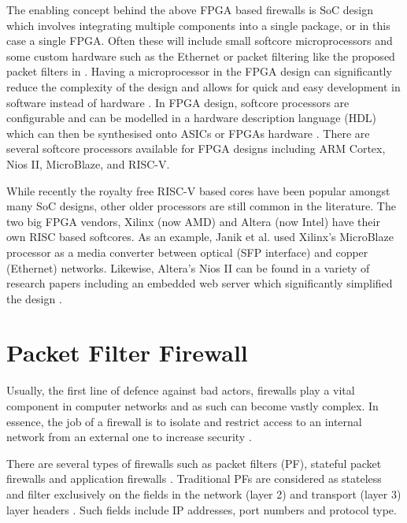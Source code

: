 The enabling concept behind the above FPGA based firewalls is SoC design which involves integrating multiple components into a single package, or in this case a 
single FPGA. Often these will include small softcore microprocessors and some custom hardware such as the Ethernet or packet filtering like the proposed packet filters in \cite{LwIPFPGAFirewall}.
Having a microprocessor in the FPGA design can significantly reduce the complexity of the design and allows for quick and easy development in software instead of 
hardware \cite{SoftcoreBasedEmbeddedSystems}. In FPGA design, softcore processors are configurable and can be modelled in a hardware description language (HDL) 
which can then be synthesised onto ASICs or FPGAs hardware \cite{SoftcoreBasedEmbeddedSystems}. There are several softcore processors available for FPGA 
designs including ARM Cortex, Nios II, MicroBlaze, and RISC-V. 
 
While recently the royalty free RISC-V based cores have been popular amongst many SoC designs, other older processors are still common in the literature. The two 
big FPGA vendors, Xilinx (now AMD) and Altera (now Intel) have their own RISC based softcores. As an example, Janik et al. \cite{LwIPMicroblaze} used Xilinx's MicroBlaze processor 
as a media converter between optical (SFP interface) and copper (Ethernet) networks. Likewise, Altera's Nios II can be found in a variety of research papers 
including an embedded web server which significantly simplified the design \cite{NiosIIWebserver}. 



\section{Packet Filter Firewall}

Usually, the first line of defence against bad actors, firewalls play a vital component in computer networks and as such can become vastly complex. 
In essence, the job of a firewall is to isolate and restrict access to an internal network from an external one to increase security \cite{BuildingInternetFirewalls}.

There are several types of firewalls such as packet filters (PF), stateful packet firewalls and application firewalls \cite{FirewallsBook}. 
Traditional PFs are considered as stateless and filter exclusively on the fields in the network (layer 2) and transport 
(layer 3) layer headers \cite{FirewallsBook}. Such fields include IP addresses, port numbers and protocol type.


